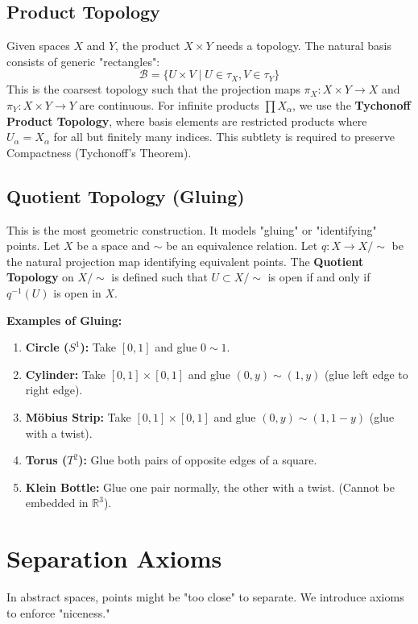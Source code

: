 \subsection{Product Topology}
Given spaces $X$ and $Y$, the product $X \times Y$ needs a topology.
The natural basis consists of generic "rectangles":
\[ \mathcal{B} = \{ U \times V \mid U \in \tau_X, V \in \tau_Y \} \]
This is the coarsest topology such that the projection maps $\pi_X: X \times Y \to X$ and $\pi_Y: X \times Y \to Y$ are continuous.
For infinite products $\prod X_\alpha$, we use the \textbf{Tychonoff Product Topology}, where basis elements are restricted products where $U_\alpha = X_\alpha$ for all but finitely many indices. This subtlety is required to preserve Compactness (Tychonoff's Theorem).

\subsection{Quotient Topology (Gluing)}
This is the most geometric construction. It models "gluing" or "identifying" points.
Let $X$ be a space and $\sim$ be an equivalence relation. Let $q: X \to X/\sim$ be the natural projection map identifying equivalent points.
The \textbf{Quotient Topology} on $X/\sim$ is defined such that $U \subset X/\sim$ is open if and only if $q^{-1}(U)$ is open in $X$.

\textbf{Examples of Gluing:}
\begin{enumerate}
    \item \textbf{Circle ($S^1$):} Take $[0, 1]$ and glue $0 \sim 1$.
    \item \textbf{Cylinder:} Take $[0,1] \times [0,1]$ and glue $(0, y) \sim (1, y)$ (glue left edge to right edge).
    \item \textbf{Möbius Strip:} Take $[0,1] \times [0,1]$ and glue $(0, y) \sim (1, 1-y)$ (glue with a twist).
    \item \textbf{Torus ($T^2$):} Glue both pairs of opposite edges of a square.
    \item \textbf{Klein Bottle:} Glue one pair normally, the other with a twist. (Cannot be embedded in $\mathbb{R}^3$).
\end{enumerate}

\section{Separation Axioms}

In abstract spaces, points might be "too close" to separate. We introduce axioms to enforce "niceness."

